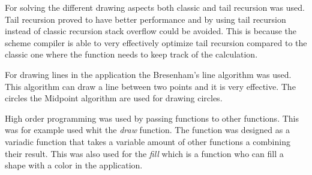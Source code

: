 For solving the different drawing aspects both classic and tail recursion was used. Tail recursion proved to have better performance and by using tail recursion instead of classic recursion stack overflow could be avoided. This is because the scheme compiler is able to very effectively optimize tail recursion compared to the classic one where the function needs to keep track of the calculation.

For drawing lines in the application the Bresenham’s line algorithm was used. This algorithm can draw a line between two points and it is very effective. The circles the Midpoint algorithm are used for drawing circles.

High order programming was used by passing functions to other functions. This was for example used whit the \emph{draw} function. The function was designed as a variadic function that takes a variable amount of other functions a combining their result. This was also used for the \emph{fill} which is a function who can fill a shape with a color in the application.

